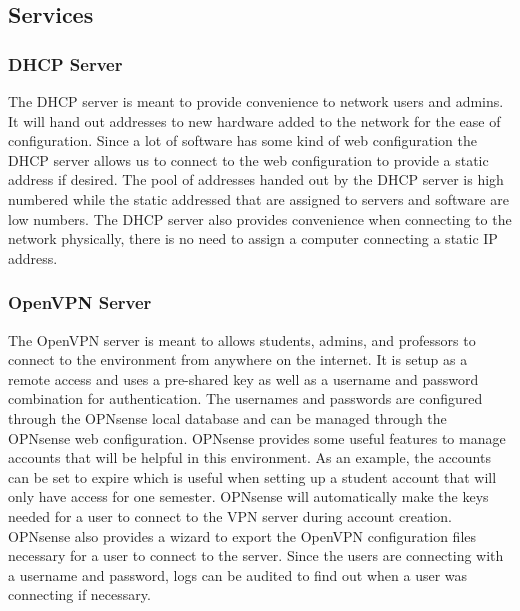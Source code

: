 \documentclass[12pt]{IEEEtran}
\begin{document}
\subsection{Services}
\subsubsection{DHCP Server}
The DHCP server is meant to provide convenience to network users and admins.
It will hand out addresses to new hardware added to the network for the ease of configuration. 
Since a lot of software has some kind of web configuration the DHCP server allows us to connect to the web configuration to provide a static address if desired. 
The pool of addresses handed out by the DHCP server is high numbered while the static addressed that are assigned to servers and software are low numbers. 
The DHCP server also provides convenience when connecting to the network physically, there is no need to assign a computer connecting a static IP address. 

\subsubsection{OpenVPN Server}
The OpenVPN server is meant to allows students, admins, and professors to connect to the environment from anywhere on the internet. 
It is setup as a remote access and uses a pre-shared key as well as a username and password combination for authentication.
The usernames and passwords are configured through the OPNsense local database and can be managed through the OPNsense web configuration.
OPNsense provides some useful features to manage accounts that will be helpful in this environment.
As an example, the accounts can be set to expire which is useful when setting up a student account that will only have access for one semester. 
OPNsense will automatically make the keys needed for a user to connect to the VPN server during account creation. 
OPNsense also provides a wizard to export the OpenVPN configuration files necessary for a user to connect to the server. 
Since the users are connecting with a username and password, logs can be audited to find out when a user was connecting if necessary. 
\end{document}
